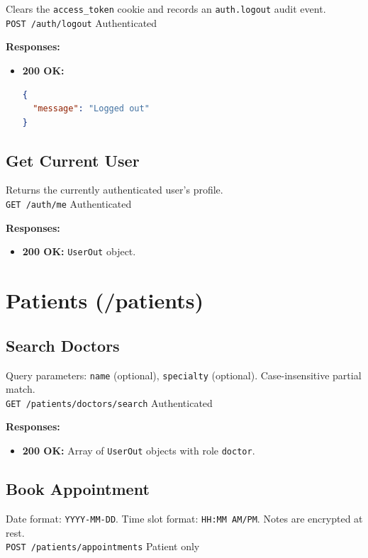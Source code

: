 \documentclass[a4paper,12pt]{report}
\begin{document}
Clears the \texttt{access\_token} cookie and records an \texttt{auth.logout} audit event. \\
\texttt{POST /auth/logout} \hfill Authenticated

\noindent\textbf{Responses:}
\begin{itemize}
    \item \textbf{200 OK:}
\begin{lstlisting}[language=json]
{
  "message": "Logged out"
}
\end{lstlisting}
\end{itemize}

\subsection{Get Current User}

Returns the currently authenticated user's profile. \\
\texttt{GET /auth/me} \hfill Authenticated

\noindent\textbf{Responses:}
\begin{itemize}
    \item \textbf{200 OK:} \texttt{UserOut} object.
\end{itemize}

\section{Patients (/patients)}

\subsection{Search Doctors}

Query parameters: \texttt{name} (optional), \texttt{specialty} (optional). Case-insensitive partial match. \\
\texttt{GET /patients/doctors/search} \hfill Authenticated

\noindent\textbf{Responses:}
\begin{itemize}
    \item \textbf{200 OK:} Array of \texttt{UserOut} objects with role \texttt{doctor}.
\end{itemize}

\subsection{Book Appointment}

Date format: \texttt{YYYY-MM-DD}. Time slot format: \texttt{HH:MM AM/PM}. Notes are encrypted at rest. \\
\texttt{POST /patients/appointments} \hfill Patient only
\end{document}
